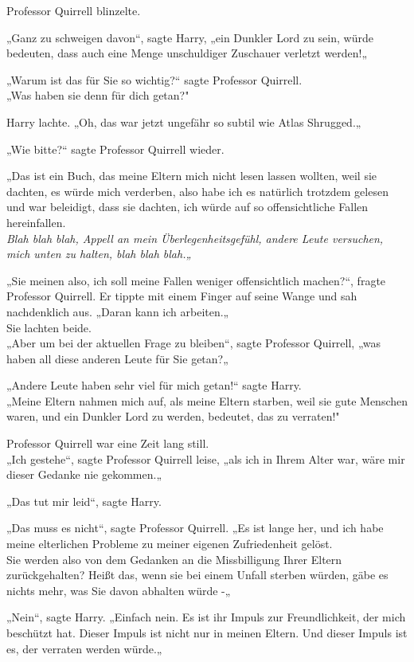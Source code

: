 {Professor Quirrell blinzelte.

„Ganz zu schweigen davon“, sagte Harry, „ein Dunkler Lord zu sein, würde bedeuten, dass auch eine Menge unschuldiger Zuschauer verletzt werden!„

„Warum ist das für Sie so wichtig?“ sagte Professor Quirrell.\\ „Was haben sie denn für dich getan?"

Harry lachte. „Oh, das war jetzt ungefähr so subtil wie Atlas Shrugged.„

„Wie bitte?“ sagte Professor Quirrell wieder.

„Das ist ein Buch, das meine Eltern mich nicht lesen lassen wollten, weil sie dachten, es würde mich verderben, also habe ich es natürlich trotzdem gelesen und war beleidigt, dass sie dachten, ich würde auf so offensichtliche Fallen hereinfallen.\\ \emph{Blah blah blah, Appell an mein Überlegenheitsgefühl, andere Leute versuchen, mich unten zu halten, blah blah blah.„}

„Sie meinen also, ich soll meine Fallen weniger offensichtlich machen?“, fragte Professor Quirrell. Er tippte mit einem Finger auf seine Wange und sah nachdenklich aus. „Daran kann ich arbeiten.„\\ Sie lachten beide.\\ „Aber um bei der aktuellen Frage zu bleiben“, sagte Professor Quirrell, „was haben all diese anderen Leute für Sie getan?„

„Andere Leute haben sehr viel für mich getan!“ sagte Harry.\\ „Meine Eltern nahmen mich auf, als meine Eltern starben, weil sie gute Menschen waren, und ein Dunkler Lord zu werden, bedeutet, das zu verraten!"

Professor Quirrell war eine Zeit lang still.\\ „Ich gestehe“, sagte Professor Quirrell leise, „als ich in Ihrem Alter war, wäre mir dieser Gedanke nie gekommen.„

„Das tut mir leid“, sagte Harry.

„Das muss es nicht“, sagte Professor Quirrell. „Es ist lange her, und ich habe meine elterlichen Probleme zu meiner eigenen Zufriedenheit gelöst.\\ Sie werden also von dem Gedanken an die Missbilligung Ihrer Eltern zurückgehalten? Heißt das, wenn sie bei einem Unfall sterben würden, gäbe es nichts mehr, was Sie davon abhalten würde -„

„Nein“, sagte Harry. „Einfach nein. Es ist ihr Impuls zur Freundlichkeit, der mich beschützt hat. Dieser Impuls ist nicht nur in meinen Eltern. Und dieser Impuls ist es, der verraten werden würde.„

}
